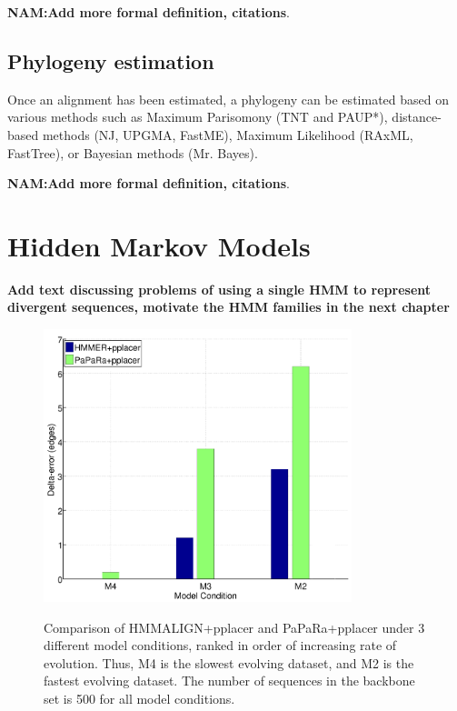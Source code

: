 \textbf{NAM:Add more formal definition, citations}.

\subsection{Phylogeny estimation}\label{back:phylogeny}

Once an alignment has been estimated, a phylogeny can be estimated based on various methods such as Maximum Parisomony (TNT and PAUP*), distance-based methods (NJ, UPGMA, FastME), Maximum Likelihood (RAxML, FastTree), or Bayesian methods (Mr. Bayes).  

\textbf{NAM:Add more formal definition, citations}.

\section{Hidden Markov Models}\label{back:hmm}

\textbf{Add text discussing problems of using a single HMM to represent divergent sequences, motivate the HMM families in the next chapter}
\begin{figure}[htbp]
\centering
{\includegraphics[width=0.80\textwidth]{sepp/hmmer_papara}}
\caption[Comparison of HMMALIGN+pplacer and PaPaRa+pplacer.]{Comparison of HMMALIGN+pplacer and PaPaRa+pplacer under 3 different model conditions, ranked in order of increasing rate of evolution.  Thus, M4 is the slowest evolving dataset, and M2 is the fastest evolving dataset.  The number of sequences in the backbone set is 500 for all model conditions.} 
\label{background:initial}
\end{figure}


